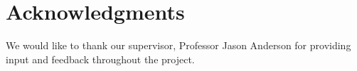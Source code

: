 \section*{Acknowledgments}

We would like to thank our supervisor, Professor Jason Anderson for providing input and feedback throughout the project.

